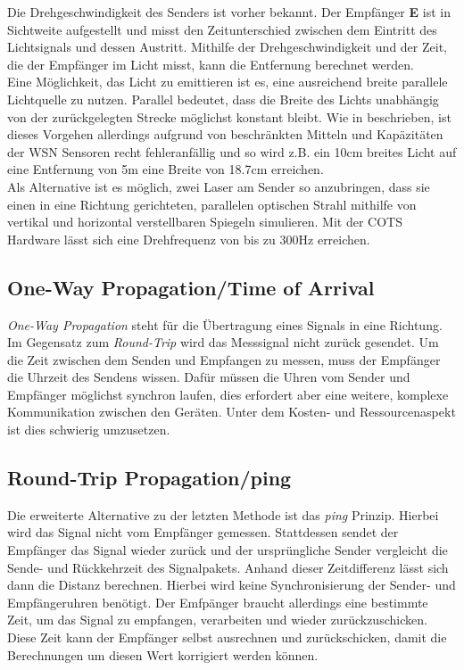 \documentclass[12pt, a4wide]{scrreprt}
\begin{document}
Die Drehgeschwindigkeit des Senders ist vorher bekannt. Der Empfänger {\bf E} ist in Sichtweite aufgestellt und misst den Zeitunterschied zwischen dem Eintritt des Lichtsignals und dessen Austritt. Mithilfe der Drehgeschwindigkeit und der Zeit, die der Empfänger im Licht misst, kann die Entfernung berechnet werden.\\
\indent
Eine Möglichkeit, das Licht zu emittieren ist es, eine ausreichend breite parallele Lichtquelle zu nutzen. Parallel bedeutet, dass die Breite des Lichts unabhängig von der zurückgelegten Strecke möglichst konstant bleibt. Wie in \cite{lighthouse} beschrieben, ist dieses Vorgehen allerdings aufgrund von beschränkten Mitteln und Kapäzitäten der WSN Sensoren recht fehleranfällig und so wird z.B. ein 10cm breites Licht auf eine Entfernung von 5m eine Breite von 18.7cm erreichen.\\
\indent
Als Alternative ist es möglich, zwei Laser am Sender so anzubringen, dass sie einen in eine Richtung gerichteten, parallelen optischen Strahl mithilfe von vertikal und horizontal verstellbaren Spiegeln simulieren. Mit der COTS Hardware lässt sich eine Drehfrequenz von bis zu 300Hz\cite{lighthouse} erreichen. 
\newpage
    \subsection{One-Way Propagation/Time of Arrival}
\textit{One-Way Propagation} steht für die Übertragung eines Signals in eine Richtung. Im Gegensatz zum \textit{Round-Trip} wird das Messsignal nicht zurück gesendet. Um die Zeit zwischen dem Senden und Empfangen zu messen, muss der Empfänger die Uhrzeit des Sendens wissen. Dafür müssen die Uhren vom Sender und Empfänger möglichst synchron laufen, dies erfordert aber eine weitere, komplexe Kommunikation zwischen den Geräten. Unter dem Kosten- und Ressourcenaspekt ist dies schwierig umzusetzen.
	\subsection{Round-Trip Propagation/ping}
Die erweiterte Alternative zu der letzten Methode ist das \textit{ping} Prinzip. Hierbei wird das Signal nicht vom Empfänger gemessen. Stattdessen sendet der Empfänger das Signal wieder zurück und der ursprüngliche Sender vergleicht die Sende- und Rückkehrzeit des Signalpakets. Anhand dieser Zeitdifferenz lässt sich dann die Distanz berechnen. Hierbei wird keine Synchronisierung der Sender- und Empfängeruhren benötigt. Der Emfpänger braucht allerdings eine bestimmte Zeit, um das Signal zu empfangen, verarbeiten und wieder zurückzuschicken. Diese Zeit kann der Empfänger selbst ausrechnen und zurückschicken, damit die Berechnungen um diesen Wert korrigiert werden können.\\
\end{document}

